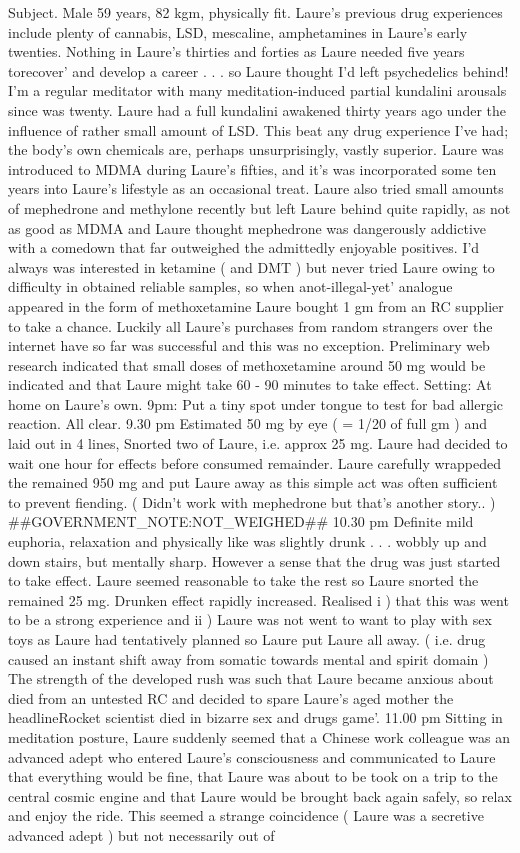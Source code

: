 \documentclass[12pt]{book}
\begin{document}
Subject. Male 59 years, 82 kgm, physically fit. Laure's previous drug experiences include plenty of cannabis, LSD, mescaline, amphetamines in Laure's early twenties. Nothing in Laure's thirties and forties as Laure needed five years torecover' and develop a career . . .  so Laure thought I'd left psychedelics behind! I'm a regular meditator with many meditation-induced partial kundalini arousals since was twenty. Laure had a full kundalini awakened thirty years ago under the influence of rather small amount of LSD. This beat any drug experience I've had; the body's own chemicals are, perhaps unsurprisingly, vastly superior. Laure was introduced to MDMA during Laure's fifties, and it's was incorporated some ten years into Laure's lifestyle as an occasional treat. Laure also tried small amounts of mephedrone and methylone recently but left Laure behind quite rapidly, as not as good as MDMA and Laure thought mephedrone was dangerously addictive with a comedown that far outweighed the admittedly enjoyable positives. I'd always was interested in ketamine ( and DMT ) but never tried Laure owing to difficulty in obtained reliable samples, so when anot-illegal-yet' analogue appeared in the form of methoxetamine Laure bought 1 gm from an RC supplier to take a chance. Luckily all Laure's purchases from random strangers over the internet have so far was successful and this was no exception. Preliminary web research indicated that small doses of methoxetamine around 50 mg would be indicated and that Laure might take 60 - 90 minutes to take effect. Setting: At home on Laure's own. 9pm: Put a tiny spot under tongue to test for bad allergic reaction. All clear. 9.30 pm Estimated 50 mg by eye ( = 1/20 of full gm ) and laid out in 4 lines, Snorted two of Laure, i.e. approx 25 mg. Laure had decided to wait one hour for effects before consumed remainder. Laure carefully wrappeded the remained 950 mg and put Laure away as this simple act was often sufficient to prevent fiending. ( Didn't work with mephedrone but that's another story.. ) \#\#GOVERNMENT\_NOTE:NOT\_WEIGHED\#\# 10.30 pm Definite mild euphoria, relaxation and physically like was slightly drunk . . .  wobbly up and down stairs, but mentally sharp. However a sense that the drug was just started to take effect. Laure seemed reasonable to take the rest so Laure snorted the remained 25 mg. Drunken effect rapidly increased. Realised i ) that this was went to be a strong experience and ii ) Laure was not went to want to play with sex toys as Laure had tentatively planned so Laure put Laure all away. ( i.e. drug caused an instant shift away from somatic towards mental and spirit domain ) The strength of the developed rush was such that Laure became anxious about died from an untested RC and decided to spare Laure's aged mother the headlineRocket scientist died in bizarre sex and drugs game'. 11.00 pm Sitting in meditation posture, Laure suddenly seemed that a Chinese work colleague was an advanced adept who entered Laure's consciousness and communicated to Laure that everything would be fine, that Laure was about to be took on a trip to the central cosmic engine and that Laure would be brought back again safely, so relax and enjoy the ride. This seemed a strange coincidence ( Laure was a secretive advanced adept ) but not necessarily out of 
\end{document}
